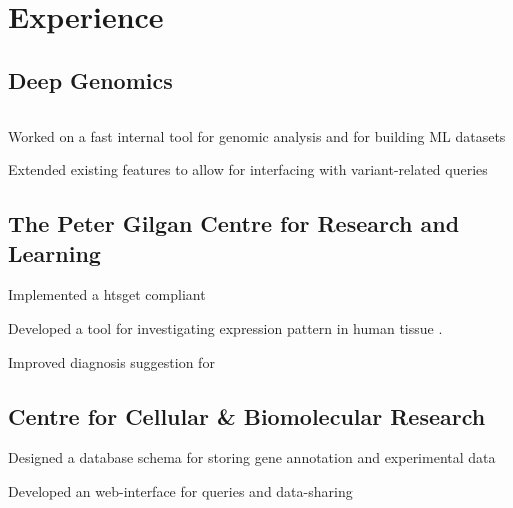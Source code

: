 \documentclass[]{deedy-resume-openfont}
\begin{document}
    \begin{minipage}[t]{0.66\textwidth} 
    
    \section{Experience}
    \subsection{Deep Genomics}
    $ $\\
    \begin{tightemize}
        \item Worked on a fast internal tool for genomic analysis and for building ML datasets
        \item Extended existing features to allow for interfacing with variant-related queries
    \end{tightemize}
    \sectionsep
    
    \subsection{The Peter Gilgan Centre for Research and Learning}
    \begin{tightemize}
        \item Implemented a htsget compliant \href{http:github.com/tt6746690/htsget}{} 
        \item Developed a tool for investigating expression pattern in human tissue \href{http:github.com/tt6746690/SickKidsSummer}{}.
        \item Improved diagnosis suggestion for \href{http:phenotips.org}{} 
    \end{tightemize}
    \sectionsep
    
    \subsection{Centre for Cellular \& Biomolecular Research}
    \begin{tightemize}
        \item Designed a database schema for storing gene annotation and experimental data
        \item Developed an web-interface \href{https://github.com/tt6746690/EdgoDB}{} for queries and data-sharing
    \end{tightemize}
    \sectionsep
    


\end{minipage}
\end{document}
